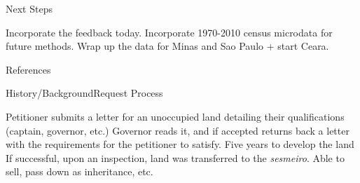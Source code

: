\documentclass[aspectratio=1610]{beamer}
\begin{document}
\begin{frame}{Next Steps}
    \begin{outline}
        \1 Incorporate the feedback today.
        \vspace{2mm}
        \1 Incorporate 1970-2010 census microdata for future methods.
        \vspace{2mm}
        \1 Wrap up the data for Minas and Sao Paulo + start Ceara.
    \end{outline}
\end{frame}

\begin{frame}{References}
    \printbibliography
\end{frame}

\appendix

\begin{frame}{History/Background}{Request Process}
    \begin{outline}
        \1 Petitioner submits a letter for an unoccupied land detailing their qualifications (captain, governor, etc.)
        \vspace{1mm}
        \1 Governor reads it, and if accepted returns back a letter with the requirements for the petitioner to satisfy.
        \vspace{1mm}
        \1 Five years to develop the land
        \vspace{1mm}
        \1 If successful, upon an inspection, land was transferred to the \textit{sesmeiro}.
        \vspace{1mm}
        \1 Able to sell, pass down as inheritance, etc. 
    \end{outline}
\end{frame}

    
\end{document}

